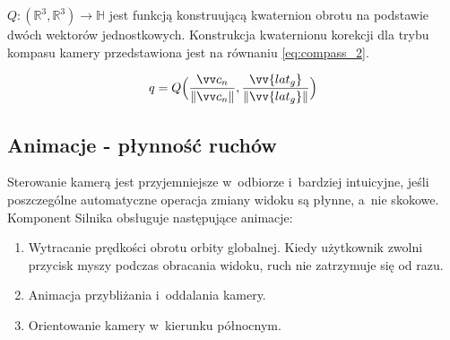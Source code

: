 $Q:(\mathbb{R}^3, \mathbb{R}^3) \to \mathbb{H}$ jest funkcją konstruującą kwaternion obrotu na podstawie dwóch wektorów jednostkowych. Konstrukcja kwaternionu korekcji dla trybu kompasu kamery przedstawiona jest na równaniu \ref{eq:compass_2}.
\begin{samepage}
  \begin{equation}
    \label{eq:compass_2}
      q = Q\Big(\normalize{\vv c_n}, \normalize{\vv{lat_g}}\Big)
  \end{equation}
  \vspace{\baselineskip}
\end{samepage}

\subsection{Animacje - płynność ruchów}

Sterowanie kamerą jest przyjemniejsze w~odbiorze i~bardziej intuicyjne, jeśli poszczególne automatyczne operacja zmiany widoku są płynne, a~nie skokowe. Komponent Silnika obsługuje następujące animacje:
\begin{enumerate}
    \item Wytracanie prędkości obrotu orbity globalnej. Kiedy użytkownik zwolni przycisk myszy podczas obracania widoku, ruch nie zatrzymuje się od razu.
    \item Animacja przybliżania i~oddalania kamery.
    \item Orientowanie kamery w~kierunku północnym.
\end{enumerate}

